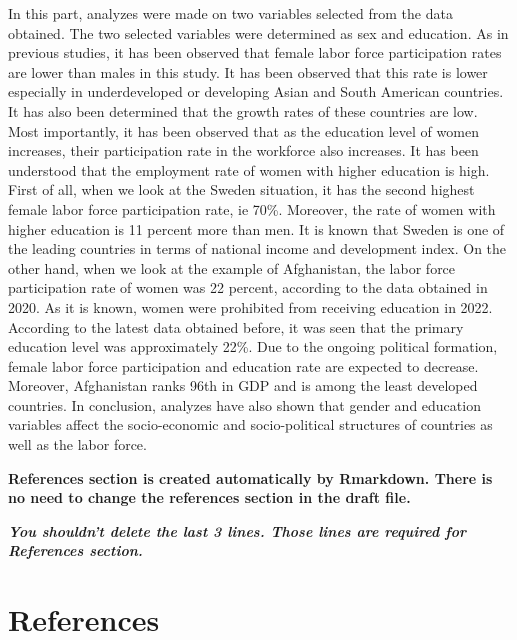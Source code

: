\documentclass[
  12pt,
]{article}
\begin{document}
In this part, analyzes were made on two variables selected from the data obtained. The two selected variables were determined as sex and education. As in previous studies, it has been observed that female labor force participation rates are lower than males in this study. It has been observed that this rate is lower especially in underdeveloped or developing Asian and South American countries. It has also been determined that the growth rates of these countries are low. Most importantly, it has been observed that as the education level of women increases, their participation rate in the workforce also increases. It has been understood that the employment rate of women with higher education is high. First of all, when we look at the Sweden situation, it has the second highest female labor force participation rate, ie 70\%. Moreover, the rate of women with higher education is 11 percent more than men. It is known that Sweden is one of the leading countries in terms of national income and development index. On the other hand, when we look at the example of Afghanistan, the labor force participation rate of women was 22 percent, according to the data obtained in 2020. As it is known, women were prohibited from receiving education in 2022. According to the latest data obtained before, it was seen that the primary education level was approximately 22\%. Due to the ongoing political formation, female labor force participation and education rate are expected to decrease. Moreover, Afghanistan ranks 96th in GDP and is among the least developed countries. In conclusion, analyzes have also shown that gender and education variables affect the socio-economic and socio-political structures of countries as well as the labor force.

\textbf{References section is created automatically by Rmarkdown. There is no need to change the references section in the draft file.}

\textbf{\emph{You shouldn't delete the last 3 lines. Those lines are required for References section.}}

\newpage

\hypertarget{references}{%
\section{References}\label{references}}
\end{document}
